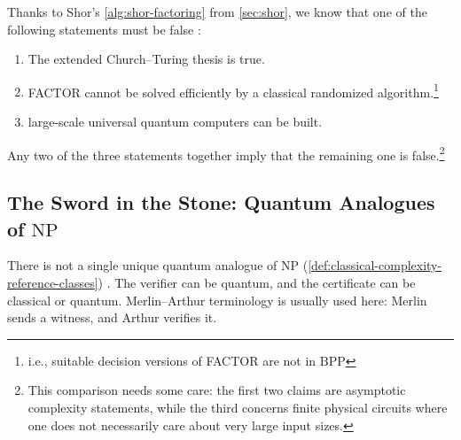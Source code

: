 Thanks to Shor's \autoref{alg:shor-factoring} from \autoref{sec:shor}, we know that one of the following statements must be false \cite{gharibianQuantumComplexityTheory}:
\begin{enumerate}
  \item The extended Church--Turing thesis is true.
  \item FACTOR cannot be solved efficiently by a classical randomized algorithm.\footnote{i.e., suitable decision versions of FACTOR are not in \(\mathrm{BPP}\)}
  \item large-scale universal quantum computers can be built.
\end{enumerate}


Any two of the three statements together imply that the remaining one is false.\footnote{%
This comparison needs some care: the first two claims are asymptotic complexity statements, while the third concerns finite physical circuits where one does not necessarily care about very large input sizes.%
}




\subsection{\texorpdfstring{The Sword in the Stone: Quantum Analogues of \(\mathrm{NP}\)}{The Sword in the Stone: Quantum Analogues of NP}}\label{sec:qma}

There is not a single unique quantum analogue of
\(
\mathrm{NP}
\) (\autoref{def:classical-complexity-reference-classes}) \cite{gharibianQuantumComplexityTheory}.
The verifier can be quantum, and the certificate can be classical or quantum.
Merlin--Arthur terminology is usually used here:
Merlin sends a witness, and Arthur verifies it.


